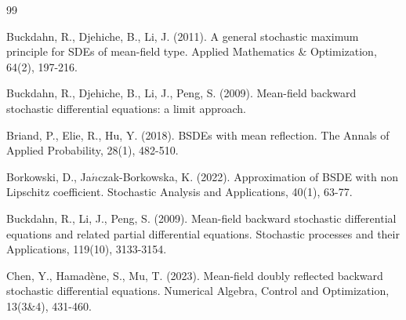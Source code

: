 \documentclass[10pt]{article}%
\numberwithin{equation}{section}
\begin{document}
 
\begin{thebibliography}{99}

 Buckdahn, R., Djehiche, B., Li, J. (2011). A general stochastic maximum principle for SDEs of mean-field type. Applied Mathematics \& Optimization, 64(2), 197-216.

 Buckdahn, R., Djehiche, B., Li, J., Peng, S. (2009). Mean-field backward stochastic differential equations: a limit approach.

 Briand, P., Elie, R., Hu, Y. (2018). BSDEs with mean reflection. The Annals of Applied Probability, 28(1), 482-510.
 
 Borkowski, D., Ja$\acute{n}$czak-Borkowska, K. (2022). Approximation of BSDE with non Lipschitz coefficient. Stochastic Analysis and Applications, 40(1), 63-77.





 Buckdahn, R., Li, J., Peng, S. (2009). Mean-field backward stochastic differential equations and related partial differential equations. Stochastic processes and their Applications, 119(10), 3133-3154.



 Chen, Y., Hamadène, S.,  Mu, T. (2023). Mean-field doubly reflected backward stochastic differential equations. Numerical Algebra, Control and Optimization, 13(3\&4), 431-460.


\end{thebibliography}
\end{document}
